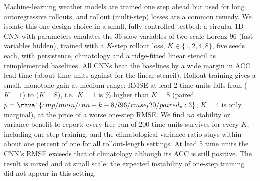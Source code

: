 Machine-learning weather models are trained one step ahead but used for long autoregressive rollouts, and rollout (multi-step) losses are a common remedy. We isolate this one design choice in a small, fully controlled testbed: a circular 1D CNN with  parameters emulates the $36$ slow variables of two-scale Lorenz-96 (fast variables hidden), trained with a $K$-step rollout loss, $K\in\{1,2,4,8\}$, five seeds each, with persistence, climatology and a ridge-fitted linear stencil as reimplemented baselines. All CNNs beat the baselines by a wide margin in ACC lead time (about  time units against  for the linear stencil). Rollout training gives a small, monotone gain at medium range: RMSE at lead 2 time units falls from  ($K{=}1$) to  ($K{=}8$), i.e.\ $K{=}1$ is \% higher than $K{=}8$ (paired $p=\rhval{cmp/main/cnn-k-8/l96/rmse_t20/paired_p:3}$; $K{=}4$ is only marginal), at the price of a worse one-step RMSE. We find \emph{no} stability or variance benefit to report: every free run of 200 time units survives for every $K$, including one-step training, and the climatological variance ratio stays within about one percent of one for all rollout-length settings. At lead 5 time units the CNN's RMSE exceeds that of climatology although its ACC is still positive. The result is mixed and at small scale: the expected instability of one-step training did not appear in this setting.
